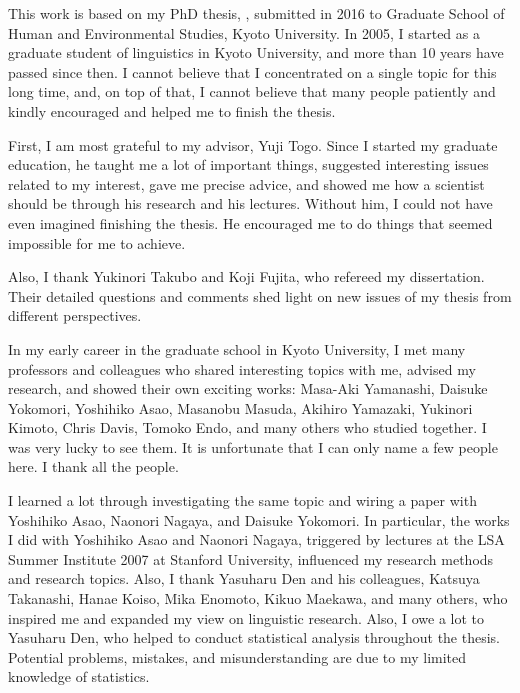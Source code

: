 \begin{refsection}

This work is based on my PhD thesis,
,
submitted in 2016 to Graduate School of Human and Environmental Studies, Kyoto University.
In 2005, I started as a graduate student of linguistics in Kyoto University, and more than 10 years have passed since then.
I cannot believe that I concentrated on a single topic for this long time,
and, on top of that,
I cannot believe that many people patiently and kindly
encouraged and helped me to finish the thesis.

First, I am most grateful to my advisor, Yuji Togo.
Since I started my graduate education,
he taught me a lot of important things,
suggested interesting issues related to my interest,
gave me precise advice, and
showed me how a scientist should be through his research and his lectures.
Without him,
I could not have even imagined finishing the thesis.
He encouraged me to do things that seemed impossible for me to achieve.

Also, I thank Yukinori Takubo and Koji Fujita,
who refereed my dissertation.
Their detailed questions and comments shed light on new issues of my thesis
from different perspectives.

In my early career in the graduate school in Kyoto University,
I met many professors and colleagues who shared interesting topics with me, advised my research, and showed their own exciting works:
Masa-Aki Yamanashi, Daisuke Yokomori, Yoshihiko Asao, Masanobu Masuda, Akihiro Yamazaki, Yukinori Kimoto, Chris Davis, Tomoko Endo, and many others who studied together.
I was very lucky to see them.
It is unfortunate that I can only name a few people here.
I thank all the people.

I learned a lot through investigating the same topic and wiring a paper with Yoshihiko Asao, Naonori Nagaya, and Daisuke Yokomori.
In particular, the works I did with Yoshihiko Asao and Naonori Nagaya,
triggered by lectures at the LSA Summer Institute 2007 at Stanford University,
influenced my research methods and research topics.
Also, I thank Yasuharu Den and his colleagues, Katsuya Takanashi, Hanae Koiso, Mika Enomoto, Kikuo Maekawa, and many others,
who inspired me and expanded my view on linguistic research.
Also, I owe a lot to Yasuharu Den, who helped to conduct statistical analysis
throughout the thesis.
Potential problems, mistakes, and misunderstanding are due to my limited knowledge of statistics.


\end{refsection}
